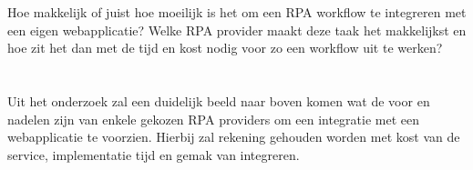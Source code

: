 Hoe makkelijk of juist hoe moeilijk is het om een RPA workflow te integreren met een eigen webapplicatie? Welke RPA provider maakt deze taak het makkelijkst en hoe zit het dan met de tijd en kost nodig voor zo een workflow uit te werken?


\section{}
\label{sec:onderzoeksdoelstelling}

Uit het onderzoek zal een duidelijk beeld naar boven komen wat de voor en nadelen zijn van enkele gekozen RPA providers om een integratie met een webapplicatie te voorzien. Hierbij zal rekening gehouden worden met kost van de service, implementatie tijd en gemak van integreren.

\section{}
\label{sec:opzet-bachelorproef}

